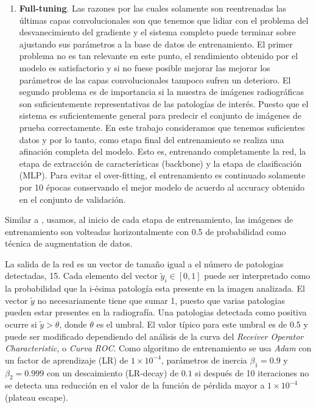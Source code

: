 {\begin{enumerate}
    \item \textbf{Full-tuning}. Las razones por las cuales solamente son reentrenadas las últimas
          capas convolucionales son que tenemos que lidiar con el problema del desvanecimiento del
          gradiente y el sistema completo puede terminar sobre ajustando sus parámetros a la base de
          datos de entrenamiento. El primer problema no es tan relevante en este punto, el
          rendimiento obtenido por el modelo es satisfactorio y si no fuese posible mejorar las
          mejorar los parámetros de las capas convolucionales tampoco sufren un deterioro. El segundo
          problema es de importancia si la muestra de imágenes radiográficas son suficientemente
          representativas de las patologías de interés. Puesto que el sistema es suficientemente
          general para predecir el conjunto de imágenes de prueba correctamente. En este trabajo
          consideramos que tenemos suficientes datos y por lo tanto, como etapa final del entrenamiento
          se realiza una afinación completa del modelo. Esto es, entrenando completamente la red,
          la etapa de extracción de características (backbone) y la etapa de clasificación (MLP).
          Para evitar el over-fitting, el entrenamiento es continuado solamente por 10 épocas
          conservando el mejor modelo de acuerdo al accuracy obtenido en el conjunto de validación.

\end{enumerate}

Similar a \citeauthor{rajpurkar2018deep}, usamos, al inicio de cada etapa de entrenamiento, las
imágenes de entrenamiento son volteadas horizontalmente con 0.5 de probabilidad como técnica de
augmentation de datos.

La salida de la red es un vector de tamaño igual a el número de patologias detectadas, 15. Cada
elemento del vector $\tilde y_i \in [0,1]$ puede ser interpretado como la probabilidad que la
i-ésima patología esta presente en la imagen analizada. El vector $\tilde y$ no necesariamente tiene
que sumar 1, puesto que varias patologias pueden estar presentes en la radiografía. Una patologias
detectada como positiva ocurre si  $\tilde y > \theta$, donde $\theta$ es el umbral. El valor típico
para este umbral es de $0.5$ y puede ser modificado dependiendo del análisis de la curva del \textit{Receiver
Operator Characteristic}, o \textit{Curva ROC}. Como algoritmo de entrenamiento se usa \emph{Adam}
\cite{kingma15adam} con un factor de aprendizaje (LR) de $1\times 10^{-4}$, parámetros de inercia
$\beta_1=0.9$ y $\beta_2=0.999$ con un descaimiento (LR-decay) de $0.1$ si después de 10 iteraciones
no se detecta una reducción en el valor de la función de pérdida mayor a $1\times 10^{-4}$ (plateau
escape).

}
